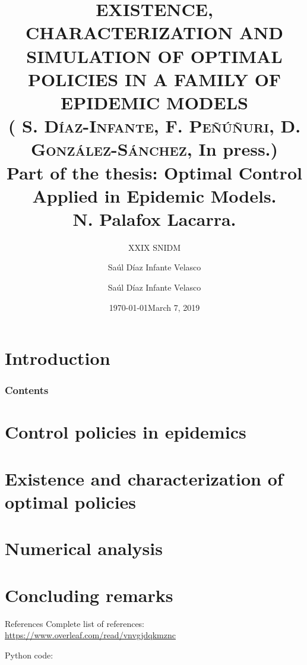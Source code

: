 \documentclass[10pt]{beamer}
\title{%
    EXISTENCE,
    CHARACTERIZATION AND SIMULATION OF OPTIMAL
    POLICIES IN A FAMILY OF EPIDEMIC MODELS
    \\
    \small{
        (%
        \textsc{%
            S. D\'iaz-Infante, %
            F. Pe\~n\'u\~nuri, %
            D. Gonz\'alez-S\'anchez,
        } In press.)
        \\%
        Part of the thesis:
        Optimal Control Applied in Epidemic Models.
        \\
        N. Palafox Lacarra.
        }{}
}
\subtitle{XXIX SNIDM}
\date{\today}
\author{Sa\'ul D\'iaz Infante Velasco}
\institute{CONACYT-Universidad de Sonora}
\author[Sa\'ul D\'iaz Infante Velasco]{
        Sa\'ul D\'iaz Infante Velasco
    }
\date[\ccbyncsa]{March 7, 2019 }
\begin{document}
    \begin{frame}[plain]
        \maketitle
    \end{frame}
    \section{Introduction}
        
        \begin{frame}
            \frametitle{Contents}
            \tableofcontents
        \end{frame}
    \section{Control policies in epidemics}
        
        
    \section{Existence and characterization of optimal policies}
        
        
    \section{Numerical analysis}
        
        
    \section{Concluding remarks}
        
%

        \begin{frame}{References}
            Complete list of references:
            \href{https://www.overleaf.com/read/vnvgjdqkmznc
            }{https://www.overleaf.com/read/vnvgjdqkmznc}
            
            Python code:
            \nocite{python_repo}
            
            
        \end{frame}
\end{document}
